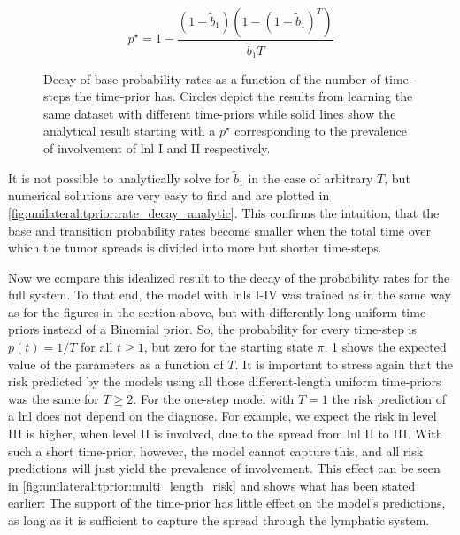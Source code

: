 \documentclass[\relativeRoot/main.tex]{subfiles}
\begin{document}
%
\begin{equation} \label{eq:unilateral:tprior:analytical_result}
    p^{\star} = 1 - \frac{\left(1 - \tilde{b}_1\right) \left( 1 - (1 - \tilde{b}_1)^T \right)}{\tilde{b}_1 T}
\end{equation}
%
\begin{figure}
    \centering
    \def\svgwidth{1.0\textwidth}
    
    \caption[Sampled spread probabilities and their decay for longer evolutions of the HMM]{Decay of base probability rates as a function of the number of time-steps the time-prior has. Circles depict the results from learning the same dataset with different time-priors while solid lines show the analytical result starting with a $p^{\star}$ corresponding to the prevalence of involvement of \gls{lnl} I and II respectively.}
    \label{fig:unilateral:tprior:rate_decay_sampled}
\end{figure}

It is not possible to analytically solve for $\tilde{b}_1$ in the case of arbitrary $T$, but numerical solutions are very easy to find and are plotted in \cref{fig:unilateral:tprior:rate_decay_analytic}. This confirms the intuition, that the base and transition probability rates become smaller when the total time over which the tumor spreads is divided into more but shorter time-steps.

Now we compare this idealized result to the decay of the probability rates for the full system. To that end, the model with \glspl{lnl} I-IV was trained as in the same way as for the figures in the section above, but with differently long uniform time-priors instead of a Binomial prior. So, the probability for every time-step is $p(t)=1/T$ for all $t \geq 1$, but zero for the starting state $\pi$. \cref{fig:unilateral:tprior:rate_decay_sampled} shows the expected value of the parameters as a function of $T$. It is important to stress again that the risk predicted by the models using all those different-length uniform time-priors was the same for $T \geq 2$. For the one-step model with $T=1$ the risk prediction of a \gls{lnl} does not depend on the diagnose. For example, we expect the risk in level III is higher, when level II is involved, due to the spread from \gls{lnl} II to III. With such a short time-prior, however, the model cannot capture this, and all risk predictions will just yield the prevalence of involvement. This effect can be seen in \cref{fig:unilateral:tprior:multi_length_risk} and shows what has been stated earlier: The support of the time-prior has little effect on the model's predictions, as long as it is sufficient to capture the spread through the lymphatic system.
\end{document}
